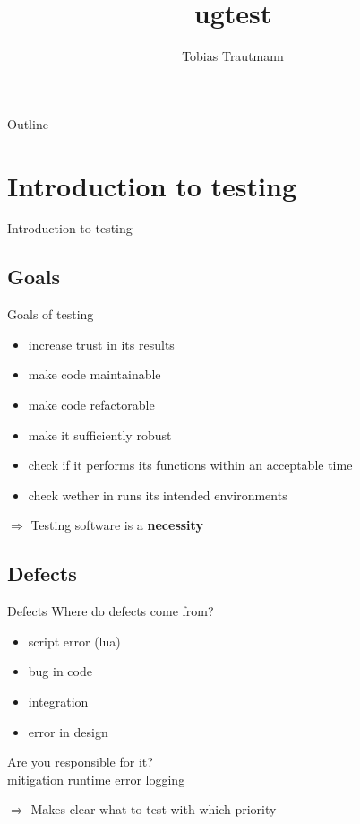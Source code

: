 \documentclass{beamer}
\title[ugtest]{ugtest}
\author{Tobias Trautmann}
\institute{GCSC}
\newcommand{\sectiontitle}[1]{
    \section{#1}
    \begin{frame}
        \centering
        \LARGE{#1}
    \end{frame}
}
\begin{document}
    \begin{frame}
        \titlepage
    \end{frame}

    \begin{frame}{Outline}
        \tableofcontents
    \end{frame}


    \sectiontitle{Introduction to testing}
        \subsection{Goals}
        \begin{frame}{Goals of testing}
           \begin{itemize}
                \item increase trust in its results\pause
                \item make code maintainable\pause
                \item make code refactorable\pause
                \item make it sufficiently robust\pause
                \item check if it performs its functions within an acceptable time\pause
                \item check wether in runs its intended environments
           \end{itemize}
           \Large{$\Rightarrow$ Testing software is a \textbf{necessity}}
        \end{frame}

        \subsection{Defects}
        \begin{frame}{Defects}
            Where do defects come from?\\
            \begin{itemize}
                \item script error (lua)
                \item bug in code
                \item integration
                \item error in design
            \end{itemize}
            Are you responsible for it?\\
            mitigation
            runtime error logging
            
            $\Rightarrow$ Makes clear what to test with which priority

        \end{frame}
        
\end{document}
